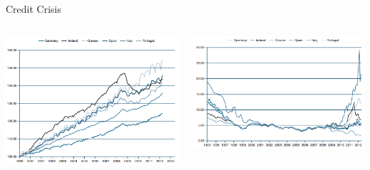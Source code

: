 \documentclass[10pt,hyperref={CJKbookmarks=true},xcolor=dvipsnames,aspectratio=169]{beamer}
\begin{document}
\begin{frame}{Credit Crisis}
\begin{columns}[onlytextwidth]
\begin{column}{0.5\textwidth}
			\centering
	\includegraphics[scale=0.35]{fig/euro/inflation2}
\end{column}
\begin{column}{0.5\textwidth}
	\centering
	\includegraphics[scale=0.33]{fig/euro/bond}
\end{column}
\end{columns}

\end{frame}
\end{document}
